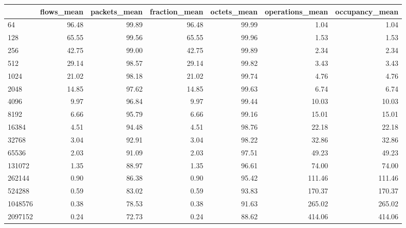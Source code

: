 \begin{tabular}{lrrrrrr}
\toprule
{} &  flows\_mean &  packets\_mean &  fraction\_mean &  octets\_mean &  operations\_mean &  occupancy\_mean \\
\midrule
64         &       96.48 &         99.89 &          96.48 &        99.99 &             1.04 &            1.04 \\
128        &       65.55 &         99.56 &          65.55 &        99.96 &             1.53 &            1.53 \\
256        &       42.75 &         99.00 &          42.75 &        99.89 &             2.34 &            2.34 \\
512        &       29.14 &         98.57 &          29.14 &        99.82 &             3.43 &            3.43 \\
1024       &       21.02 &         98.18 &          21.02 &        99.74 &             4.76 &            4.76 \\
2048       &       14.85 &         97.62 &          14.85 &        99.63 &             6.74 &            6.74 \\
4096       &        9.97 &         96.84 &           9.97 &        99.44 &            10.03 &           10.03 \\
8192       &        6.66 &         95.79 &           6.66 &        99.16 &            15.01 &           15.01 \\
16384      &        4.51 &         94.48 &           4.51 &        98.76 &            22.18 &           22.18 \\
32768      &        3.04 &         92.91 &           3.04 &        98.22 &            32.86 &           32.86 \\
65536      &        2.03 &         91.09 &           2.03 &        97.51 &            49.23 &           49.23 \\
131072     &        1.35 &         88.97 &           1.35 &        96.61 &            74.00 &           74.00 \\
262144     &        0.90 &         86.38 &           0.90 &        95.42 &           111.46 &          111.46 \\
524288     &        0.59 &         83.02 &           0.59 &        93.83 &           170.37 &          170.37 \\
1048576    &        0.38 &         78.53 &           0.38 &        91.63 &           265.02 &          265.02 \\
2097152    &        0.24 &         72.73 &           0.24 &        88.62 &           414.06 &          414.06 \\

\end{tabular}
